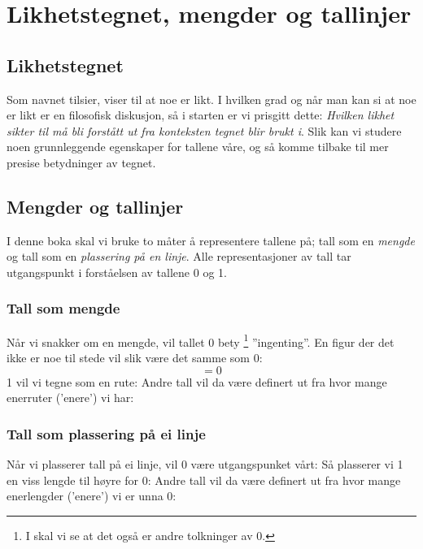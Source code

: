 




\newpage
\section{Likhetstegnet, mengder og tallinjer}
\subsection*{Likhetstegnet}
Som navnet tilsier, viser   
\sym{$ = $}
til at noe er likt. I hvilken grad og når man kan si at noe er likt er en filosofisk diskusjon, så i starten er vi prisgitt dette: \textsl{Hvilken likhet
\sym{$ = $}
sikter til må bli forstått ut fra konteksten tegnet blir brukt i}. Slik kan vi studere noen grunnleggende egenskaper for tallene våre, og så komme tilbake til mer\\ presise betydninger av tegnet. \regv
{}
\subsection*{Mengder og tallinjer}
I denne boka skal vi bruke to måter å representere tallene på; tall som en \textsl{mengde} og tall som en \textsl{plassering på en linje}. Alle representasjoner av tall tar utgangspunkt i forståelsen av tallene 0 og 1.
\newpage
\subsubsection*{Tall som mengde}
	Når vi snakker om en mengde, vil tallet 0 bety\!\!
	\footnote{I  
	skal vi se at det også er andre tolkninger av 0.} 
	''ingenting''. En figur der det ikke er noe til stede vil slik være det samme som 0:
	\[ =0 \]
	1 vil vi tegne som en rute:
Andre tall vil da være definert ut fra hvor mange enerruter ('enere') vi har: \vs
\subsubsection*{Tall som plassering på ei linje}
	Når vi plasserer tall på ei linje, vil 0 være utgangspunket vårt:
	Så plasserer vi 1 en viss lengde til høyre for 0:
	Andre tall vil da være definert ut fra hvor mange enerlengder ('enere') vi er unna 0:
